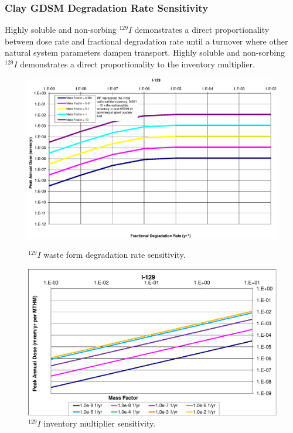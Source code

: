 \begin{frame}[ctb!]
\frametitle{Clay GDSM Degradation Rate Sensitivity}

Highly soluble and non-sorbing $^{129}I$ demonstrates a direct proportionality between dose rate and 
fractional degradation rate until a turnover where other natural system 
parameters dampen transport. Highly soluble and non-sorbing $^{129}I$ demonstrates a direct 
proportionality to the inventory multiplier.

\begin{figure}[ht!]
\begin{minipage}[b]{0.45\linewidth}
\centering
\includegraphics[width=\linewidth]{./nuclide_demonstration/DegRate/I-129.eps}
\caption{$^{129}I$ waste form degradation rate sensitivity.}
\label{fig:WFDegI129}

\end{minipage}
\hspace{0.05\linewidth}
\begin{minipage}[b]{0.45\linewidth}

\includegraphics[width=\linewidth]{./nuclide_demonstration/DegRate/I-129-MF.eps}
\caption{$^{129}I$ inventory multiplier sensitivity.}
\label{fig:WFDegI129MF}

\end{minipage}
\end{figure}
\end{frame}
